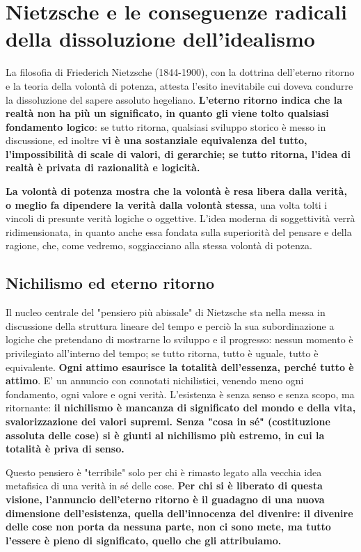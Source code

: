 \chapter{Nietzsche e le conseguenze radicali della dissoluzione dell'idealismo}
\bigskip
\bigskip
\bigskip
\bigskip
\bigskip
\bigskip


La filosofia di Friederich Nietzsche (1844-1900), con la dottrina dell'eterno ritorno e la teoria della volontà di potenza, attesta l'esito inevitabile cui doveva condurre la dissoluzione del sapere assoluto hegeliano. \textbf{L'eterno ritorno indica che la realtà non ha più un significato, in quanto gli viene tolto qualsiasi fondamento logico}: se tutto ritorna, qualsiasi sviluppo storico è messo in discussione, ed inoltre \textbf{vi è una sostanziale equivalenza del tutto, l'impossibilità di scale di valori, di gerarchie; se tutto ritorna,  l'idea di realtà è privata di razionalità e logicità.}

\textbf{La volontà di potenza mostra che la volontà è resa libera dalla verità, o meglio fa dipendere la verità dalla volontà stessa}, una volta tolti i vincoli di presunte verità logiche o oggettive. L'idea moderna di soggettività verrà ridimensionata, in quanto anche essa fondata sulla superiorità del pensare e della ragione, che, come vedremo, soggiacciano alla stessa volontà di potenza.

\section{Nichilismo ed eterno ritorno}

Il nucleo centrale del "pensiero più abissale" di Nietzsche sta nella messa in discussione della struttura lineare del tempo e perciò la sua subordinazione a logiche che pretendano di mostrarne lo sviluppo e il progresso: nessun momento è privilegiato all'interno del tempo; se tutto ritorna, tutto è uguale, tutto è equivalente. \textbf{Ogni attimo esaurisce la totalità dell'essenza, perché tutto è attimo}.
E' un annuncio con connotati nichilistici, venendo meno ogni fondamento, ogni valore e ogni verità. L'esistenza è senza senso e senza scopo, ma ritornante: \textbf{il nichilismo è  mancanza di significato del mondo e della vita, svalorizzazione dei valori supremi. Senza "cosa in sé" (costituzione assoluta delle cose) si è giunti al nichilismo più estremo, in cui la totalità è priva di senso.}

Questo pensiero è "terribile" solo per chi è rimasto legato alla vecchia idea metafisica di una verità in sé delle cose. \textbf{Per chi si è liberato di questa visione, l'annuncio dell'eterno ritorno è il guadagno di una nuova dimensione dell'esistenza, quella dell'innocenza del divenire: il divenire delle cose non porta da nessuna parte, non ci sono mete, ma tutto l'essere è pieno di significato, quello che gli attribuiamo.}

